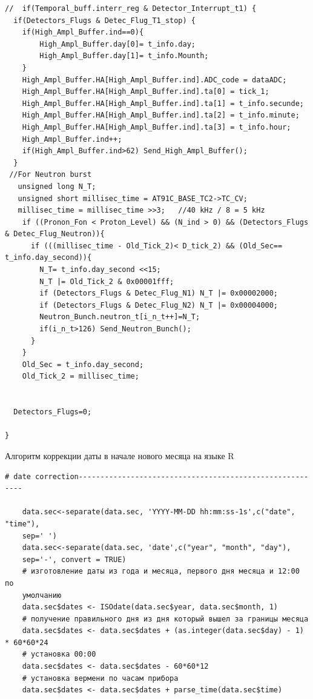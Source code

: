 \begin{lstlisting}[language={[ISO]C++}]
//  if(Temporal_buff.interr_reg & Detector_Interrupt_t1) {
  if(Detectors_Flugs & Detec_Flug_T1_stop) {
    if(High_Ampl_Buffer.ind==0){
        High_Ampl_Buffer.day[0]= t_info.day;
        High_Ampl_Buffer.day[1]= t_info.Mounth;
    }    
    High_Ampl_Buffer.HA[High_Ampl_Buffer.ind].ADC_code = dataADC;
    High_Ampl_Buffer.HA[High_Ampl_Buffer.ind].ta[0] = tick_1;
    High_Ampl_Buffer.HA[High_Ampl_Buffer.ind].ta[1] = t_info.secunde;
    High_Ampl_Buffer.HA[High_Ampl_Buffer.ind].ta[2] = t_info.minute;
    High_Ampl_Buffer.HA[High_Ampl_Buffer.ind].ta[3] = t_info.hour;
    High_Ampl_Buffer.ind++;
    if(High_Ampl_Buffer.ind>62) Send_High_Ampl_Buffer();    
  }     
 //For Neutron burst 
   unsigned long N_T;
   unsigned short millisec_time = AT91C_BASE_TC2->TC_CV;
   millisec_time = millisec_time >>3;   //40 kHz / 8 = 5 kHz
    if ((Pronon_Fon < Proton_Level) && (N_ind > 0) && (Detectors_Flugs & Detec_Flug_Neutron)){      
      if (((millisec_time - Old_Tick_2)< D_tick_2) && (Old_Sec== t_info.day_second)){
        N_T= t_info.day_second <<15;
        N_T |= Old_Tick_2 & 0x00001fff;
        if (Detectors_Flugs & Detec_Flug_N1) N_T |= 0x00002000;
        if (Detectors_Flugs & Detec_Flug_N2) N_T |= 0x00004000;
        Neutron_Bunch.neutron_t[i_n_t++]=N_T;
        if(i_n_t>126) Send_Neutron_Bunch();
      }
    }
    Old_Sec = t_info.day_second;
    Old_Tick_2 = millisec_time;        
   
  
  Detectors_Flugs=0;

}	
\end{lstlisting}




\begin{ListingEnv}[H]
	\caption{Алгоритм коррекции даты в начале нового месяца на языке R}
	\label{list:datecor}
	\begin{lstlisting}[language={Renhanced}]
	# date correction---------------------------------------------------------
	
	data.sec<-separate(data.sec, 'YYYY-MM-DD hh:mm:ss-1s',c("date", "time"),
	sep=' ')
	data.sec<-separate(data.sec, 'date',c("year", "month", "day"),
	sep='-', convert = TRUE)
	# изготовление даты из года и месяца, первого дня месяца и 12:00 по 
	умолчанию
	data.sec$dates <- ISOdate(data.sec$year, data.sec$month, 1)
	# получение правильного дня из дня который вышел за границы месяца
	data.sec$dates <- data.sec$dates + (as.integer(data.sec$day) - 1) * 60*60*24
	# установка 00:00  
	data.sec$dates <- data.sec$dates - 60*60*12 
	# установка вермени по часам прибора
	data.sec$dates <- data.sec$dates + parse_time(data.sec$time)
	
	\end{lstlisting}
\end{ListingEnv}


